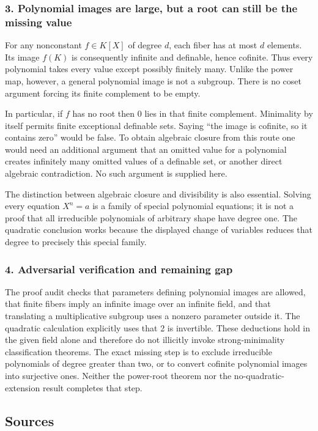 \documentclass[11pt,a4paper]{article}
\begin{document}
\subsubsection{3. Polynomial images are large, but a root can still be the missing value}
For any nonconstant $f\in K[X]$ of degree $d$, each fiber has at most $d$ elements. Its image $f(K)$ is consequently infinite and definable, hence cofinite. Thus every polynomial takes every value except possibly finitely many. Unlike the power map, however, a general polynomial image is not a subgroup. There is no coset argument forcing its finite complement to be empty.

In particular, if $f$ has no root then $0$ lies in that finite complement. Minimality by itself permits finite exceptional definable sets. Saying ``the image is cofinite, so it contains zero'' would be false. To obtain algebraic closure from this route one would need an additional argument that an omitted value for a polynomial creates infinitely many omitted values of a definable set, or another direct algebraic contradiction. No such argument is supplied here.

The distinction between algebraic closure and divisibility is also essential. Solving every equation $X^n=a$ is a family of special polynomial equations; it is not a proof that all irreducible polynomials of arbitrary shape have degree one. The quadratic conclusion works because the displayed change of variables reduces that degree to precisely this special family.

\subsubsection{4. Adversarial verification and remaining gap}
The proof audit checks that parameters defining polynomial images are allowed, that finite fibers imply an infinite image over an infinite field, and that translating a multiplicative subgroup uses a nonzero parameter outside it. The quadratic calculation explicitly uses that 2 is invertible. These deductions hold in the given field alone and therefore do not illicitly invoke strong-minimality classification theorems. The exact missing step is to exclude irreducible polynomials of degree greater than two, or to convert cofinite polynomial images into surjective ones. Neither the power-root theorem nor the no-quadratic-extension result completes that step.

\subsection{Sources}
\end{document}
